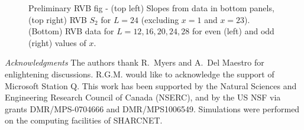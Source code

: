 \documentclass[prl,aps,twocolumn,floatfix,amsmath,amssymb,superscriptaddress,tightenlines]{revtex4}
\begin{document}
 \begin{figure}[ht]
   \begin{center}
   \end{center}
   \caption{Preliminary RVB fig - (top left) Slopes from data in bottom panels, (top right) RVB $S_2$ for $L=24$ (excluding $x=1$ and $x=23$). (Bottom) RVB data for $L=12,16,20,24,28$ for even (left) and odd (right) values of $x$.}
   \label{fig:2}
 \end{figure}

{\it Acknowledgments} 
The authors thank R.~Myers and A.~Del Maestro for enlightening discussions. 
R.G.M. would like to acknowledge the support of Microsoft Station Q.
This work has been supported by the Natural Sciences and Engineering
Research Council of Canada (NSERC), and by the US NSF via grants DMR/MPS-0704666 and DMR/MPS1006549.  Simulations were performed on the computing facilities of SHARCNET.



\end{document}
